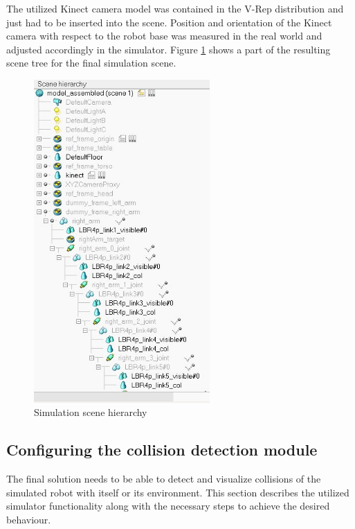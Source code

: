 The utilized Kinect camera model was contained in the V-Rep distribution and just had to be inserted into the scene. Position and orientation of the Kinect camera with respect to the robot base was measured in the real world and adjusted accordingly in the simulator. Figure \ref{fig:sim_scene_tree} shows a part of the resulting scene tree for the final simulation scene. 
\begin{figure}[p]
	\centering
  	\includegraphics[width=0.6\textwidth]{images/scene_tree.jpg}
	\caption{Simulation scene hierarchy}
	\label{fig:sim_scene_tree}
\end{figure}

\subsection{Configuring the collision detection module}
\label{sec:config_col}

The final solution needs to be able to detect and visualize collisions of the simulated robot with itself or its environment. This section describes the utilized simulator functionality along with the necessary steps to achieve the desired behaviour. \\

